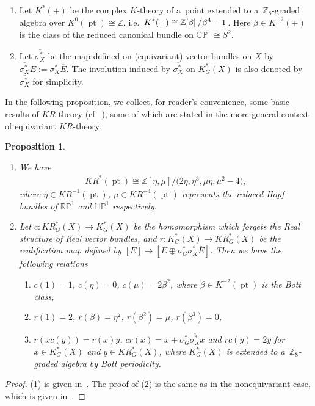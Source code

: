 \documentclass[11pt]{article}
\numberwithin{equation}{section}
\newtheorem{Proposition}[Theorem]{Proposition}
{\theoremstyle{definition}
\newtheorem{Definition}[Theorem]{Definition}
\newtheorem{Example}[Theorem]{Example}
\newtheorem{Remark}[Theorem]{Remark}
}
\DeclareMathOperator{\pt}{pt}
\begin{document}
\begin{Definition}\quad
\begin{enumerate}\itemsep=0pt
\item
Let $K^*(+)$ be the complex $K$-theory of a~point extended to a~$\mathbb{Z}_8$-graded algebra over
$K^0(\pt)\cong\mathbb{Z}$, i.e.\
$\displaystyle K^*(+)\cong\mathbb{Z}[\beta]\left/\beta^4-1\right.$.
Here $\beta\in K^{-2}(+)$ is the class of the reduced canonical bundle on $\mathbb{CP}^1\cong S^2$.
\item
Let $\overline{\sigma_X^*}$ be the map def\/ined on (equivariant) vector bundles on $X$ by $\overline{\sigma_X^*}
E:=
\sigma_X^*\overline{E}$.
The involution induced by $\overline{\sigma_X^*}$ on $K^*_G(X)$ is also denoted by $\overline{\sigma_X^*}$ for simplicity.
\end{enumerate}
\end{Definition}
In the following proposition, we collect, for reader's convenience, some basic results of $KR$-theory
(cf.~\cite[Section~2]{Se}), some of which are stated in the more general context of equivariant $KR$-theory.
\begin{Proposition}\label{krprelim}\quad
\begin{enumerate}\itemsep=0pt
\item[$1.$]
We have
\begin{gather*}
KR^*(\pt)\cong\mathbb{Z}[\eta, \mu]\big/\big(2\eta, \eta^3, \mu\eta, \mu^2-4\big) ,
\end{gather*}
where $\eta\in KR^{-1}(\pt)$, $\mu\in KR^{-4}(\pt)$ represents the reduced Hopf bundles of
$\mathbb{R}\mathbb{P}^1$ and $\mathbb{H}\mathbb{P}^1$ respectively.
\item[$2.$]
Let $c: KR^*_G(X)\to K^*_G(X)$ be the homomorphism which forgets the Real structure of Real vector bundles, and $r:
K^*_G(X)\to KR^*_G(X)$ be the realification map defined by $[E]\mapsto [E\oplus
\sigma_G^*\sigma_X^*\overline{E}
]$.
Then we have the following relations
\begin{enumerate}\itemsep=0pt
\item[$(a)$]
$c(1)=1$, $c(\eta)=0$, $c(\mu)=2\beta^2$, where $\beta\in K^{-2}(\pt)$ is the Bott class,
\item[$(b)$]
$r(1)=2$, $r(\beta)=\eta^2$, $r(\beta^2)=\mu$, $r(\beta^3)=0$,
\item[$(c)$]
$r(xc(y))=r(x)y$, $cr(x)=x+
\sigma_G^*\overline{\sigma_X^*}
x$ and $rc(y)=2y$ for $x\in K^*_G(X)$ and $y\in KR^*_G(X)$, where $K^*_G(X)$ is extended to a~$\mathbb{Z}_8$-graded
algebra by Bott periodicity.
\end{enumerate}
\end{enumerate}
\end{Proposition}
\begin{proof}
(1) is given in~\cite[Section~2]{Se}.
The proof of (2) is the same as in the nonequivariant case, which is given in~\cite{At3}.
\end{proof}
\end{document}
